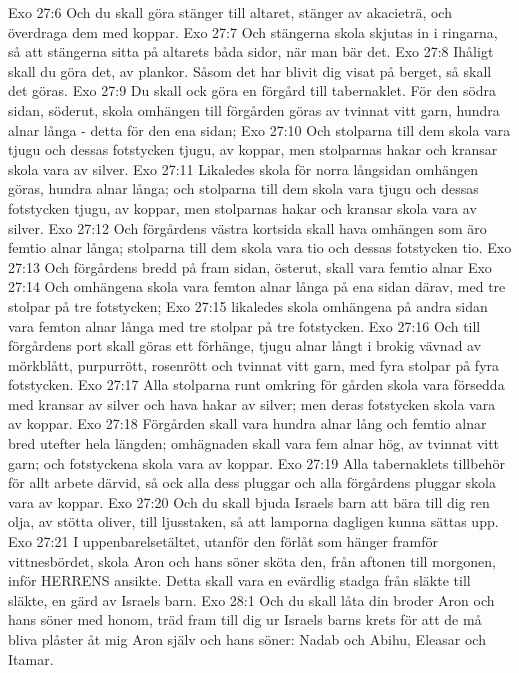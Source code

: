 Exo 27:6  Och du skall göra stänger till altaret, stänger av akacieträ, och överdraga dem med koppar.
Exo 27:7  Och stängerna skola skjutas in i ringarna, så att stängerna sitta på altarets båda sidor, när man bär det.
Exo 27:8  Ihåligt skall du göra det, av plankor. Såsom det har blivit dig visat på berget, så skall det göras.
Exo 27:9  Du skall ock göra en förgård till tabernaklet. För den södra sidan, söderut, skola omhängen till förgården göras av tvinnat vitt garn, hundra alnar långa - detta för den ena sidan;
Exo 27:10  Och stolparna till dem skola vara tjugu och dessas fotstycken tjugu, av koppar, men stolparnas hakar och kransar skola vara av silver.
Exo 27:11  Likaledes skola för norra långsidan omhängen göras, hundra alnar långa; och stolparna till dem skola vara tjugu och dessas fotstycken tjugu, av koppar, men stolparnas hakar och kransar skola vara av silver.
Exo 27:12  Och förgårdens västra kortsida skall hava omhängen som äro femtio alnar långa; stolparna till dem skola vara tio och dessas fotstycken tio.
Exo 27:13  Och förgårdens bredd på fram sidan, österut, skall vara femtio alnar
Exo 27:14  Och omhängena skola vara femton alnar långa på ena sidan därav, med tre stolpar på tre fotstycken;
Exo 27:15  likaledes skola omhängena på andra sidan vara femton alnar långa med tre stolpar på tre fotstycken.
Exo 27:16  Och till förgårdens port skall göras ett förhänge, tjugu alnar långt i brokig vävnad av mörkblått, purpurrött, rosenrött och tvinnat vitt garn, med fyra stolpar på fyra fotstycken.
Exo 27:17  Alla stolparna runt omkring för gården skola vara försedda med kransar av silver och hava hakar av silver; men deras fotstycken skola vara av koppar.
Exo 27:18  Förgården skall vara hundra alnar lång och femtio alnar bred utefter hela längden; omhägnaden skall vara fem alnar hög, av tvinnat vitt garn; och fotstyckena skola vara av koppar.
Exo 27:19  Alla tabernaklets tillbehör för allt arbete därvid, så ock alla dess pluggar och alla förgårdens pluggar skola vara av koppar.
Exo 27:20  Och du skall bjuda Israels barn att bära till dig ren olja, av stötta oliver, till ljusstaken, så att lamporna dagligen kunna sättas upp.
Exo 27:21  I uppenbarelsetältet, utanför den förlåt som hänger framför vittnesbördet, skola Aron och hans söner sköta den, från aftonen till morgonen, inför HERRENS ansikte. Detta skall vara en evärdlig stadga från släkte till släkte, en gärd av Israels barn.
Exo 28:1  Och du skall låta din broder Aron och hans söner med honom, träd fram till dig ur Israels barns krets för att de må bliva plåster åt mig Aron själv och hans söner: Nadab och Abihu, Eleasar och Itamar.
